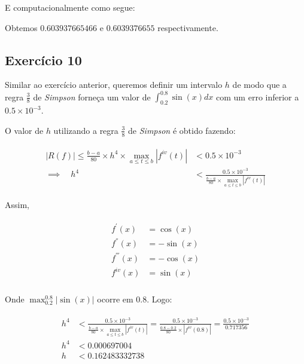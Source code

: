 \documentclass[paper=a4, fontsize=12pt]{scrartcl}
\numberwithin{equation}{section} %
\numberwithin{figure}{section} %
\numberwithin{table}{section} %
\begin{document}
		E computacionalmente como segue:

		\hspace{2cm}

		

		\hspace{2cm}

		


		Obtemos $ 0.603937665466 $ e $ 0.6039376655 $ respectivamente.

		\subsection{Exercício 10}

		Similar ao exercício anterior, queremos definir um intervalo $h$ de modo que a regra $\frac{3}{8}$ de \textit{Simpson} forneça um valor de $\int_{0.2}^{0.8}\sin(x)dx$ com um erro inferior a $0.5 \times 10^{-3}$.

		O valor de $h$ utilizando a regra $\frac{3}{8}$ de \textit{Simpson} é obtido fazendo:

		\begin{align*}
			\begin{split}
				| R(f) | \leq \frac{b - a}{80} \times h^4 \times \max_{a \leq t \leq b} |f^{iv}(t)| & < 0.5 \times 10^{-3}\\ \implies \quad h^4  &< \frac{0.5  \times 10^{-3}}{\frac{b - a}{80} \times \max_{a \leq t \leq b} |f^{iv}(t)|}
			\end{split}
		\end{align*}

		Assim,

	  \begin{align*}
		  \begin{split}
		  f^{'} (x) &= \cos(x)\\
		  f^{''} (x) &= -\sin(x)\\
		  f^{'''} (x) &= -\cos(x)\\
		  f^{iv} (x) &= \sin(x)\\
		  \end{split}
	  \end{align*}

		Onde $ \max_{0.2}^{0.8}|\sin(x)|$ ocorre em $0.8$. Logo:

		\begin{align*}
			\begin{split}
				h^4  	&< \frac{0.5  \times 10^{-3}}{\frac{b - a}{80} \times \max_{a \leq t \leq b} |f^{iv}(t)|} =  \frac{0.5  \times 10^{-3}}{\frac{0.8 - 0.2}{80} \times |f^{iv}(0.8)|} = \frac{0.5  \times 10^{-3}}{0.717356} \\
				h^4		&<	0.000697004\\
				h			&< 0.162483332738
			\end{split}
		\end{align*}
\end{document}
